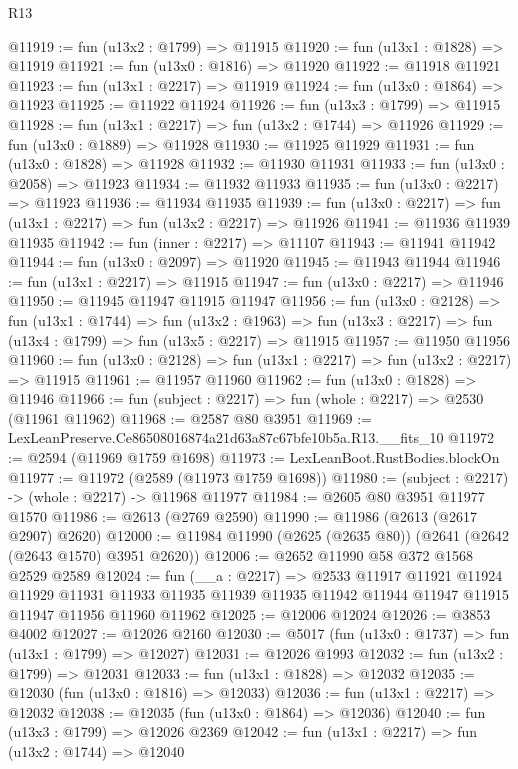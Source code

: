 \begin{lexlean}{R13}
\begin{coremodule}
@11919 := fun (u13x2 : @1799) => @11915
@11920 := fun (u13x1 : @1828) => @11919
@11921 := fun (u13x0 : @1816) => @11920
@11922 := @11918 @11921
@11923 := fun (u13x1 : @2217) => @11919
@11924 := fun (u13x0 : @1864) => @11923
@11925 := @11922 @11924
@11926 := fun (u13x3 : @1799) => @11915
@11928 := fun (u13x1 : @2217) => fun (u13x2 : @1744) => @11926
@11929 := fun (u13x0 : @1889) => @11928
@11930 := @11925 @11929
@11931 := fun (u13x0 : @1828) => @11928
@11932 := @11930 @11931
@11933 := fun (u13x0 : @2058) => @11923
@11934 := @11932 @11933
@11935 := fun (u13x0 : @2217) => @11923
@11936 := @11934 @11935
@11939 := fun (u13x0 : @2217) => fun (u13x1 : @2217) => fun (u13x2 : @2217) => @11926
@11941 := @11936 @11939 @11935
@11942 := fun (inner : @2217) => @11107
@11943 := @11941 @11942
@11944 := fun (u13x0 : @2097) => @11920
@11945 := @11943 @11944
@11946 := fun (u13x1 : @2217) => @11915
@11947 := fun (u13x0 : @2217) => @11946
@11950 := @11945 @11947 @11915 @11947
@11956 := fun (u13x0 : @2128) =>
  fun (u13x1 : @1744) =>
  fun (u13x2 : @1963) => fun (u13x3 : @2217) => fun (u13x4 : @1799) => fun (u13x5 : @2217) => @11915
@11957 := @11950 @11956
@11960 := fun (u13x0 : @2128) => fun (u13x1 : @2217) => fun (u13x2 : @2217) => @11915
@11961 := @11957 @11960
@11962 := fun (u13x0 : @1828) => @11946
@11966 := fun (subject : @2217) => fun (whole : @2217) => @2530 (@11961 @11962)
@11968 := @2587 @80 @3951
@11969 := LexLeanPreserve.Ce86508016874a21d63a87c67bfe10b5a.R13.__fits_10
@11972 := @2594 (@11969 @1759 @1698)
@11973 := LexLeanBoot.RustBodies.blockOn
@11977 := @11972 (@2589 (@11973 @1759 @1698))
@11980 := (subject : @2217) -> (whole : @2217) -> @11968 @11977
@11984 := @2605 @80 @3951 @11977 @1570
@11986 := @2613 (@2769 @2590)
@11990 := @11986 (@2613 (@2617 @2907) @2620)
@12000 := @11984 @11990 (@2625 (@2635 @80)) (@2641 (@2642 (@2643 @1570) @3951 @2620))
@12006 := @2652 @11990 @58 @372 @1568 @2529 @2589
@12024 := fun (__a : @2217) =>
  @2533
    @11917
    @11921
    @11924
    @11929
    @11931
    @11933
    @11935
    @11939
    @11935
    @11942
    @11944
    @11947
    @11915
    @11947
    @11956
    @11960
    @11962
@12025 := @12006 @12024
@12026 := @3853 @4002
@12027 := @12026 @2160
@12030 := @5017 (fun (u13x0 : @1737) => fun (u13x1 : @1799) => @12027)
@12031 := @12026 @1993
@12032 := fun (u13x2 : @1799) => @12031
@12033 := fun (u13x1 : @1828) => @12032
@12035 := @12030 (fun (u13x0 : @1816) => @12033)
@12036 := fun (u13x1 : @2217) => @12032
@12038 := @12035 (fun (u13x0 : @1864) => @12036)
@12040 := fun (u13x3 : @1799) => @12026 @2369
@12042 := fun (u13x1 : @2217) => fun (u13x2 : @1744) => @12040

\end{coremodule}
\end{lexlean}
